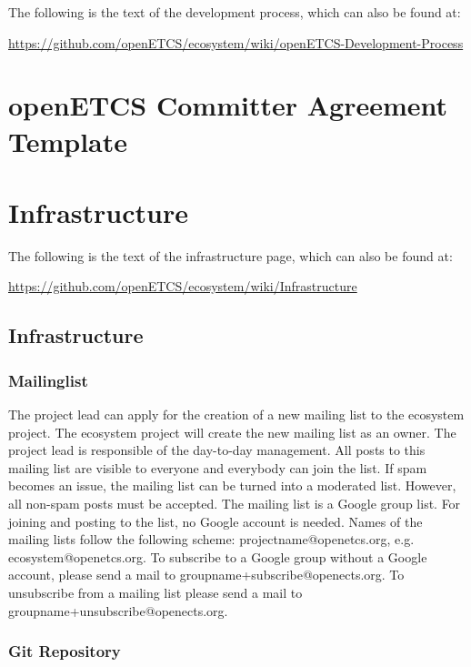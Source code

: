\documentclass{template/openetcs_report}
\begin{document}
The following is the text of the development process, which can also be found at:

\url{https://github.com/openETCS/ecosystem/wiki/openETCS-Development-Process}



\chapter{openETCS Committer Agreement Template}
\label{app:committer-agreement}




\chapter{Infrastructure}
\label{app:infrastructure}

The following is the text of the infrastructure page, which can also be found at:

\url{https://github.com/openETCS/ecosystem/wiki/Infrastructure}

\section{Infrastructure}

\subsection{Mailinglist}

The project lead can apply for the creation of a new mailing list to the ecosystem project. The ecosystem project will create the new mailing list as an owner. The project lead is responsible of the day-to-day management. All posts to this mailing list are visible to everyone and everybody can join the list. If spam becomes an issue, the mailing list can be turned into a moderated list. However, all non-spam posts must be accepted. The mailing list is a Google group list. For joining and posting to the list, no Google account is needed. Names of the mailing lists follow the following scheme: projectname@openetcs.org, e.g. ecosystem@openetcs.org. To subscribe to a Google group without a Google account, please send a mail to groupname+subscribe@openects.org. To unsubscribe from a mailing list please send a mail to groupname+unsubscribe@openects.org.

\subsection{Git Repository}
\end{document}
